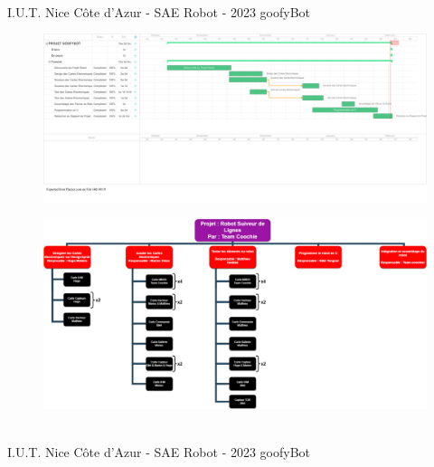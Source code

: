 \vfill
\noindent\makebox[\linewidth]{\rule{.8\paperwidth}{.6pt}}\\[0.2cm]
I.U.T. Nice Côte d'Azur - SAE Robot - 2023 \hfill goofyBot
\noindent\makebox[\linewidth]{\rule{.8\paperwidth}{.6pt}}
\newpage

\begin{figure}[H]
\centering
\begin{minipage}{.5\textwidth}
  \centering
\href{}{}  \centerline{\includegraphics[width=2.5\linewidth]{pdf/gantt.pdf}}
  \label{fig:gantt}
\end{minipage}%
\end{figure}


\begin{figure}[H]
\centering
\begin{minipage}{.5\textwidth}
  \centering
  \centerline{\includegraphics[width=2.5\linewidth]{img/obs.png}}
  \label{fig:obs}
\end{minipage}%
\end{figure}

\vfill
\noindent\makebox[\linewidth]{\rule{.8\paperwidth}{.6pt}}\\[0.2cm]
I.U.T. Nice Côte d'Azur - SAE Robot - 2023 \hfill goofyBot
\noindent\makebox[\linewidth]{\rule{.8\paperwidth}{.6pt}}
\newpage